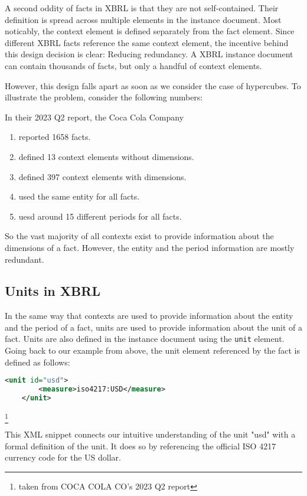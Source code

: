 A second oddity of facts in XBRL is that they are not self-contained. 
Their definition is spread across multiple elements in the instance document.
Most noticably, the context element is defined separately from the fact element.
Since different XBRL facts reference the same context element, the incentive behind this design decision is clear: Reducing redundancy.
A XBRL instance document can contain thousands of facts, but only a handful of context elements.

However, this design falls apart as soon as we consider the case of hypercubes.
To illustrate the problem, consider the following numbers:

In their 2023 Q2 report, the Coca Cola Company 

\begin{enumerate}
    \item reported 1658 facts.
    \item defined 13 context elements without dimensions.
    \item defined 397 context elements with dimensions.
    \item used the same entity for all facts.
    \item uesd around 15 different periods for all facts.
\end{enumerate}

So the vast majority of all contexts exist to provide information about the dimensions of a fact.
However, the entity and the period information are mostly redundant.

\subsection{Units in XBRL}

In the same way that contexts are used to provide information about the entity and the period of a fact, units are used to provide information about the unit of a fact.
Units are also defined in the instance document using the \texttt{unit} element.
Going back to our example from above, the unit element referenced by the fact is defined as follows:

\begin{lstlisting}[language=XML]
    <unit id="usd">
        <measure>iso4217:USD</measure>
    </unit>
\end{lstlisting}\footnote[3]{taken from COCA COLA CO's 2023 Q2 report}

This XML snippet connects our intuitive understanding of the unit "usd" with a formal definition of the unit.
It does so by referencing the official ISO 4217 currency code for the US dollar.

